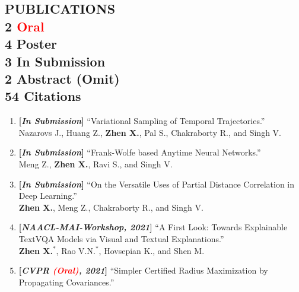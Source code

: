 \documentclass[margin]{res}
\begin{document}
\begin{resume}
\vspace{-1em}                
\section{PUBLICATIONS \\ \small{ 2 {\textcolor{red}{Oral}}\\ 4 Poster\\ 3 In Submission \\ 2 Abstract (Omit) \\ 54 Citations} }
                \begin{enumerate}[noitemsep,wide=0pt,leftmargin=\dimexpr\labelwidth + 2\labelsep\relax]\itemsep -0.0pt
                \item \textbf{[\emph{In Submission}]} ``Variational Sampling of Temporal Trajectories.''\\
                				Nazarovs J., Huang Z., \textbf{Zhen X.}, Pal S., Chakraborty R., 
                            and Singh V.
                \item \textbf{[\emph{In Submission}]} ``Frank-Wolfe based Anytime Neural Networks.''\\
                				Meng Z., \textbf{Zhen X.}, Ravi S., and Singh V.           
                \item \textbf{[\emph{In Submission}]} ``On the Versatile Uses of Partial Distance Correlation in Deep Learning.''\\
                            \textbf{Zhen X.}, Meng Z., Chakraborty R., and Singh V.
                \item \textbf{[\emph{NAACL-MAI-Workshop, 2021}]} ``A First Look: Towards Explainable TextVQA Models via Visual and Textual Explanations.''\\
                            \textbf{Zhen X.}$^*$, Rao V.N.$^*$, Hovsepian K., and Shen M.
                \item \textbf{[\emph{CVPR \textcolor{red}{(Oral)}, 2021}]} ``Simpler Certified Radius Maximization by Propagating Covariances.''\\

\end{enumerate}
\end{resume}
\end{document}

